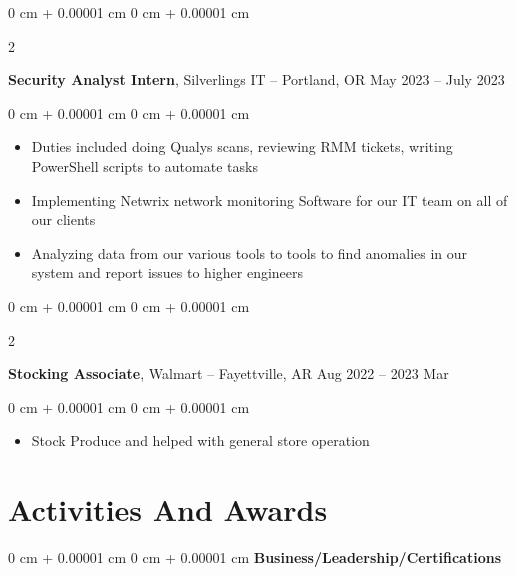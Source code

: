 \documentclass[10pt, letterpaper]{article}
\newenvironment{highlights}{
    \begin{itemize}[
        topsep=0.10 cm,
        parsep=0.10 cm,
        partopsep=0pt,
        itemsep=0pt,
        leftmargin=0 cm + 10pt
    ]
}{
    \end{itemize}
} %
\newenvironment{onecolentry}{
    \begin{adjustwidth}{
        0 cm + 0.00001 cm
    }{
        0 cm + 0.00001 cm
    }
}{
    \end{adjustwidth}
} %
\newenvironment{twocolentry}[2][]{
    \onecolentry
    \def\secondColumn{#2}
    \setcolumnwidth{\fill, 4.5 cm}
    \begin{paracol}{2}
}{
    \switchcolumn \raggedleft \secondColumn
    \end{paracol}
    \endonecolentry
} %
\begin{document}
        
        \begin{twocolentry}{
            May 2023 – July 2023
        }
            \textbf{Security Analyst Intern}, Silverlings IT -- Portland, OR\end{twocolentry}

        \vspace{0.10 cm}
        \begin{onecolentry}
            \begin{highlights}
                \item Duties included doing Qualys scans, reviewing RMM tickets, writing PowerShell scripts to automate tasks
                \item Implementing Netwrix network monitoring Software for our IT team on all of our clients
                \item Analyzing data from our various tools to tools to find anomalies in our system and report issues to higher engineers
            \end{highlights}
        \end{onecolentry}


        \vspace{0.2 cm}

        \begin{twocolentry}{
            Aug 2022 –  2023 Mar
        }
            \textbf{Stocking Associate}, Walmart -- Fayettville, AR\end{twocolentry}

        \vspace{0.10 cm}
        \begin{onecolentry}
            \begin{highlights}
                \item Stock Produce and helped with general store operation
            \end{highlights}
        \end{onecolentry}



    
    \section{Activities And Awards}

        
        \begin{onecolentry}{
        }
            \textbf{Business/Leadership/Certifications}\end{onecolentry}
\end{document}
